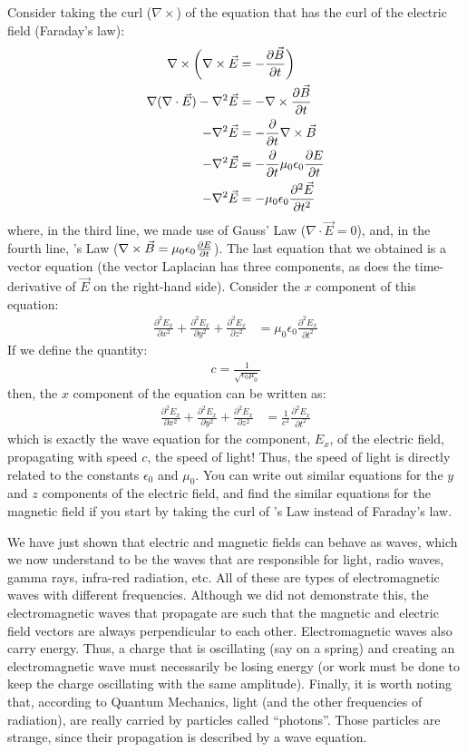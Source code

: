 Consider taking the curl ($\nabla \times$) of the equation that has the curl of the electric field (Faraday's law):
\begin{align*}
\nabla \times \bigg(\nabla \times \vec E &= -\frac{\partial \vec B}{\partial t}\bigg)\\
\nabla(\nabla\cdot \vec E)-\nabla^2\vec E &= -\nabla \times \frac{\partial \vec B}{\partial t}\\
-\nabla^2\vec E &= - \frac{\partial }{\partial t} \nabla \times \vec B\\
-\nabla^2\vec E &= - \frac{\partial }{\partial t} \mu_0 \epsilon_0\frac{\partial E}{\partial t}\\
-\nabla^2\vec E &= - \mu_0 \epsilon_0\frac{\partial^2\vec E}{\partial t^2} 
\end{align*}
where, in the third line, we made use of Gauss' Law ($\nabla \cdot \vec E=0$), and, in the fourth line, \ampere's Law ($\nabla \times \vec B = \mu_0 \epsilon_0\frac{\partial E}{\partial t}$). The last equation that we obtained is a vector equation (the vector Laplacian has three components, as does the time-derivative of $\vec E$ on the right-hand side). Consider the $x$ component of this equation:
\begin{align*}
\frac{\partial^2 E_x}{\partial x^2}+\frac{\partial^2  E_x}{\partial y^2} + \frac{\partial^2 E_x}{\partial z^2}  &= \mu_0 \epsilon_0\frac{\partial^2 E_x}{\partial t^2} 
\end{align*}
If we define the quantity:
\begin{align*}
c = \frac{1}{\sqrt{\epsilon_0\mu_0}}
\end{align*}
then, the $x$ component of the equation can be written as:
\begin{align*}
\frac{\partial^2 E_x}{\partial x^2}+\frac{\partial^2  E_x}{\partial y^2} + \frac{\partial^2 E_x}{\partial z^2} &= \frac{1}{c^2}\frac{\partial^2 E_x}{\partial t^2} 
\end{align*}
which is exactly the wave equation for the component, $E_x$, of the electric field, propagating with speed $c$, the speed of light! Thus, the speed of light is directly related to the constants $\epsilon_0$ and $\mu_0$. You can write out similar equations for the $y$ and $z$ components of the electric field, and find the similar equations for the magnetic field if you start by taking the curl of \ampere's Law instead of Faraday's law. 

We have just shown that electric and magnetic fields can behave as waves, which we now understand to be the waves that are responsible for light, radio waves, gamma rays, infra-red radiation, etc. All of these are types of electromagnetic waves with different frequencies. Although we did not demonstrate this, the electromagnetic waves that propagate are such that the magnetic and electric field vectors are always perpendicular to each other. Electromagnetic waves also carry energy. Thus, a charge that is oscillating (say on a spring) and creating an electromagnetic wave must necessarily be losing energy (or work must be done to keep the charge oscillating with the same amplitude). Finally, it is worth noting that, according to Quantum Mechanics, light (and the other frequencies of radiation), are really carried by particles called ``photons''. Those particles are strange, since their propagation is described by a wave equation. 

